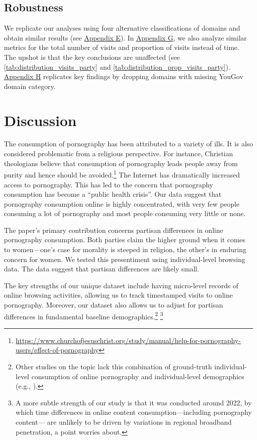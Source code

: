 \documentclass[12pt,twoside]{article}
\begin{document}
\subsection{Robustness}\label{sec:robustness}
We replicate our analyses using four alternative classifications of domains and obtain similar results (see \hyperref[sm:smE]{Appendix E}).  
In \hyperref[sm:smG]{Appendix G}, we also analyze similar metrics for the total number of visits and proportion of visits instead of time. 
The upshot is that the key conclusions are unaffected (see \cref{tab:distribution_visits_party} and \cref{tab:distribution_prop_visits_party}). 
\hyperref[sm:smH]{Appendix H} replicates key findings by dropping domains with missing YouGov domain category.

\section{Discussion}
\label{sec:discussion}
The consumption of pornography has been attributed to a variety of ills. It is also considered problematic from a religious perspective. For instance, Christian theologians believe that consumption of pornography leads people away from purity and hence should be avoided.\footnote{\url{https://www.churchofjesuschrist.org/study/manual/help-for-pornography-users/effect-of-pornography}} The Internet has dramatically increased access to pornography. This has led to the concern that pornography consumption has become a ``public health crisis''. Our data suggest that pornography consumption online is highly concentrated, with very few people consuming a lot of pornography and most people consuming very little or none.

The paper's primary contribution concerns partisan differences in online pornography consumption. Both parties claim the higher ground when it comes to women—one's case for morality is steeped in religion, the other's in enduring concern for women. We tested this presentiment using individual-level browsing data. The data suggest that partisan differences are likely small.

The key strengths of our unique dataset include having micro-level records of online browsing activities, allowing us to track timestamped visits to online pornography. Moreover, our dataset also allows us to adjust for partisan differences in fundamental baseline demographics.\footnote{Other studies on the topic lack this combination of ground-truth individual-level consumption of online pornography and individual-level demographics (e.g., \cite{Peek1982-ua, Woodrum1992-vk, Markey2011-xo, Perry2020-cp, Ybarra2005-id, Perry2018-cw, Price2016-sm, webporn, Wright2013-gl}).} \footnote{A more subtle strength of our study is that it was conducted around 2022, by which time differences in online content consumption---including pornography content--- are unlikely to be driven by variations in regional broadband penetration, a point \cite{edelman2009markets} worries about.}
\end{document}

